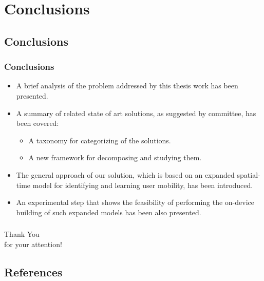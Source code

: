 \documentclass[compress,9pt,xcolor={dvipsnames,table}]{beamer}
\begin{document}
\section{Conclusions}
\subsection{Conclusions}
\begin{frame}\frametitle{Conclusions}

\begin{itemize}
  \item A brief analysis of the problem addressed by this thesis work has been presented.
  \item A summary of related state of art solutions, as suggested by committee, has been covered:
  \begin{itemize}
    \item A taxonomy for categorizing of the solutions.
    \item A new framework for decomposing and studying them. 
  \end{itemize}
  \item The general approach of our solution, which is based on an expanded spatial-time model for identifying and learning user mobility, has been introduced.
  \item An experimental step that shows the feasibility of performing the on-device building of such expanded models has been also presented. 
\end{itemize}
\end{frame}

\begin{frame}\frametitle{}
\begin{center}
{
\Huge
Thank You\\ for your attention!
}
\end{center}

\end{frame}



\subsection{References}



\end{document}
